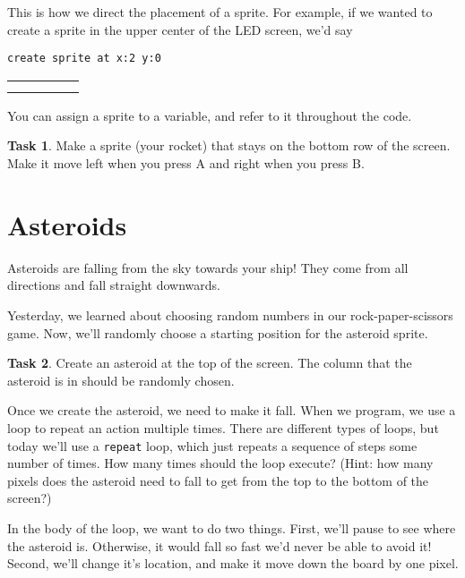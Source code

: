 \documentclass[11pt]{article}
\theoremstyle{definition}
\newtheorem{task}{Task}
\begin{document}
This is how we direct the placement of a sprite. For example, if we wanted to create a sprite in the upper center of the LED screen, we'd say
\begin{center}
\texttt{create sprite at x:2 y:0}

\vspace{4mm}

\begin{tabular}{*{5}{|c}|}
\hline
& &  & & \\ \hline
 & & & & \\ \hline
 & & & & \\ \hline
\end{tabular}
\end{center}

You can assign a sprite to a variable, and refer to it throughout the code.

\begin{task}
Make a sprite (your rocket) that stays on the bottom row of the screen. Make it move left when you press A and right when you press B.
\end{task}

\section{Asteroids}
Asteroids are falling from the sky towards your ship! They come from all directions and fall straight downwards.

Yesterday, we learned about choosing random numbers in our rock-paper-scissors game. Now, we'll randomly choose a starting position for the asteroid sprite. 

\begin{task}
Create an asteroid at the top of the screen. The column that
the asteroid is in should be randomly chosen.
\end{task}

Once we create the asteroid, we need to make it fall. When we program, we use a
loop to repeat an action multiple times. There are different types of loops, but
today we'll use a \texttt{repeat} loop, which just repeats a sequence of steps
some number of times. How many times should the loop execute? (Hint: how many
pixels does the asteroid need to fall to get from the top to the bottom of the screen?)

In the body of the loop, we want to do two things. First, we'll pause to see
where the asteroid is. Otherwise, it would fall so fast we'd never be able to
avoid it! Second, we'll change it's location, and make it move down the board by
one pixel.
\end{document}

